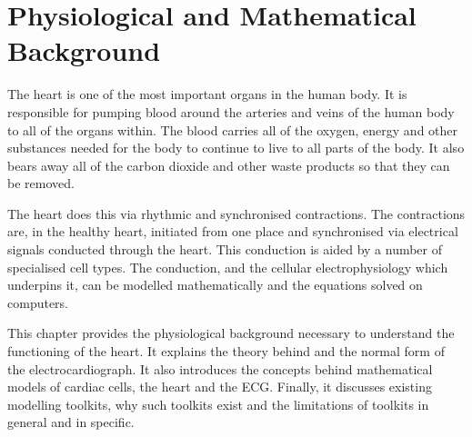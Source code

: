 \chapter{Physiological and Mathematical Background}

The heart is one of the most important organs in the human body.
It is responsible for pumping blood around the arteries and veins of the human
body to all of the organs within.
The blood carries all of the oxygen, energy and other substances needed for the
body to continue to live to all parts of the body.
It also bears away all of the carbon dioxide and other waste products so that
they can be removed.

The heart does this via rhythmic and synchronised contractions.
The contractions are, in the healthy heart, initiated from one place and
synchronised via electrical signals conducted through the heart.
This conduction is aided by a number of specialised cell types.
The conduction, and the cellular electrophysiology which underpins it, can be
modelled mathematically and the equations solved on computers.

This chapter provides the physiological background necessary to understand the
functioning of the heart.
It explains the theory behind and the normal form of the electrocardiograph.
It also introduces the concepts behind mathematical models of cardiac cells, the
heart and the ECG.
Finally, it discusses existing modelling toolkits, why such toolkits exist and
the limitations of toolkits in general and in specific.







